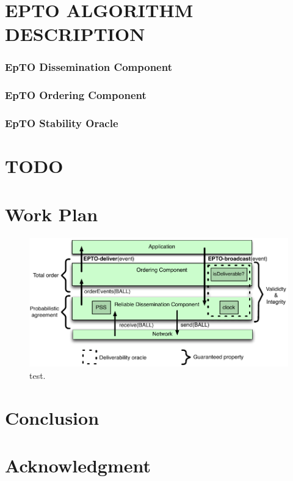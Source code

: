 \documentclass[10pt,conference,a4paper]{IEEEtran}
\begin{document}
\section{EPTO ALGORITHM DESCRIPTION}
\subsubsection{EpTO Dissemination Component}
\subsubsection{EpTO Ordering Component}
\subsubsection{EpTO Stability Oracle}
\section{TODO}
\section{Work Plan}
\begin{figure}
\includegraphics[width=\linewidth]{figures/epto-architecture.png}
\caption{test\protect\footnotemark{}.}
\label{fig:test}
\end{figure}





\section{Conclusion}




\section*{Acknowledgment}





\begin{otherlanguage}{australian}
\printbibliography
\end{otherlanguage}

\end{document}
